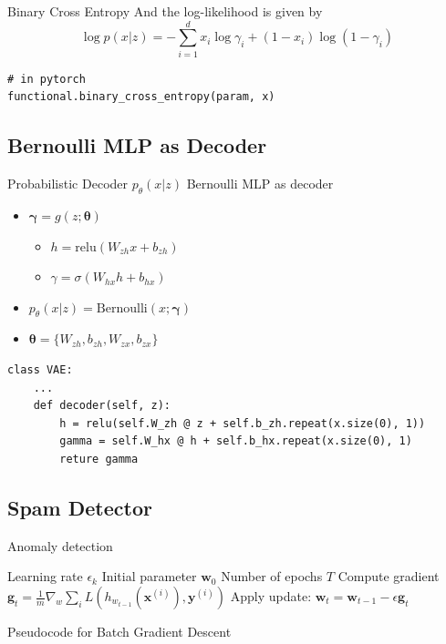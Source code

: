 \documentclass{beamer}
\newcommand{\bernoulli}{\mathrm{Bernoulli}}
\newcommand{\relu}{\mathrm{relu}}
\begin{document}
\begin{frame}[fragile]{Binary Cross Entropy}
And the log-likelihood is given by
	\begin{equation*}
	\log p(x|z) = -\sum_{i=1}^d x_i\log \gamma_i + (1-x_i)\log(1-\gamma_i) 
	\end{equation*}
\begin{verbatim}
# in pytorch
functional.binary_cross_entropy(param, x)
\end{verbatim}
\end{frame}

\subsection{Bernoulli MLP as Decoder}

\begin{frame}[fragile]{Probabilistic Decoder $p_\theta(x|z)$}
Bernoulli MLP as decoder
\begin{itemize}
	\item $\bm{\gamma}=g(z;\bm{\theta})$
	\begin{itemize}
		\item $h = \relu\left(W_{zh}x+b_{zh}\right)$
		\item $\gamma = \sigma\left(W_{hx}h+b_{hx}\right)$
	\end{itemize}
	\item $p_\theta(x|z)=\bernoulli(x;\bm{\gamma})$
	\item $\bm{\theta} = \{W_{zh}, b_{zh}, W_{zx}, b_{zx}\}$
\end{itemize}
\begin{verbatim}
class VAE:
    ...
    def decoder(self, z):
        h = relu(self.W_zh @ z + self.b_zh.repeat(x.size(0), 1))  
        gamma = self.W_hx @ h + self.b_hx.repeat(x.size(0), 1)      
        reture gamma
\end{verbatim}
\end{frame}

\subsection{Spam Detector}

\begin{frame}{Anomaly detection}  
\begin{algorithm}[H]
	\begin{algorithmic}
		\REQUIRE Learning rate $\epsilon_k$
		\REQUIRE Initial parameter $\bm{w}_0$
		\REQUIRE Number of epochs $T$
		\STATE Compute gradient $\bm{g}_t=\frac{1}{m}\nabla_w\sum_i L(h_{w_{t-1}}(\bm{x}^{(i)}), \bm{y}^{(i)})$ 
		\STATE Apply update: $\bm{w}_t=\bm{w}_{t-1}-\epsilon \bm{g}_t$
		\ENDFOR
	\end{algorithmic}
	\caption{Pseudocode for Batch Gradient Descent}
	\label{alg:se}
\end{algorithm}
\end{frame}
\end{document}
